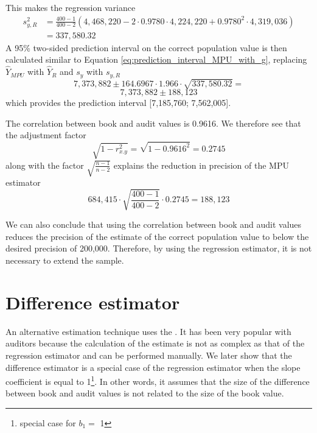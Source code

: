 This makes the regression variance
\begin{align*}
	s_{y, R}^2 &= \frac{400 - 1}{400 - 2}(4,468,220 - 2 \cdot 0.9780 \cdot 4,224,220 + 0.9780^2 \cdot 4,319,036) \\
	&= 337,580.32
\label{eq:standard_deviation_regression}
\end{align*}
A 95\% two-sided prediction interval on the correct population value is then calculated similar to Equation \ref{eq:prediction_interval_MPU_with_g}, replacing $\hat{Y}_{MPU}$ with $\hat{Y}_R$ and $s_y$ with $s_{y, R}$
\begin{equation*}
  7,373,882 \pm 164.6967 \cdot 1.966 \cdot \sqrt{337,580.32} = 
\end{equation*}
\begin{equation*}
  7,373,882 \pm 188,123
\end{equation*}
which provides the prediction interval [7,185,760; 7,562,005].

The correlation between book and audit values is 0.9616. 
We therefore see that the adjustment factor
\begin{equation*}
	\sqrt{1 - r^2_{x.y}} = \sqrt{1 - 0.9616^2} = 0.2745
\end{equation*}
along with the factor $\sqrt{\frac{n - 1}{n - 2}}$ explains the reduction in precision of the MPU estimator
\begin{equation*}
	684,415 \cdot \sqrt{\frac{400 - 1}{400 - 2}} \cdot 0.2745 = 188,123
\end{equation*}

We can also conclude that using the correlation between book and audit values reduces the precision of the estimate of the correct population value to below the desired precision of 200,000. Therefore, by using the regression estimator, it is not necessary to extend the sample.


\section{Difference estimator} %
\label{sec:difference_estimator}

An alternative estimation technique uses the . It has been very popular with auditors because the calculation of the estimate is not as complex as that of the regression estimator and can be performed manually. We later show that the difference estimator is a special case of the regression estimator when the slope coefficient is equal to 1\footnote{special case for $b_1 = $ 1}. In other words, it assumes that the size of the difference between book and audit values is not related to the size of the book value.

